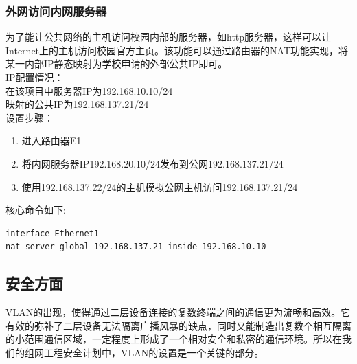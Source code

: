 \subsubsection{外网访问内网服务器}
为了能让公共网络的主机访问校园内部的服务器，如http服务器，这样可以让Internet上的主机访问校园官方主页。该功能可以通过路由器的NAT功能实现，将某一内部IP静态映射为学校申请的外部公共IP即可。
\\
\indent IP配置情况：
\\
\indent 在该项目中服务器IP为192.168.10.10/24
\\
\indent 映射的公共IP为192.168.137.21/24
\\
\indent 设置步骤：
\begin{enumerate}
\item 进入路由器E1
\item 将内网服务器IP192.168.20.10/24发布到公网192.168.137.21/24
\item 使用192.168.137.22/24的主机模拟公网主机访问192.168.137.21/24
\end{enumerate}

\indent 核心命令如下:
\begin{lstlisting}
interface Ethernet1
nat server global 192.168.137.21 inside 192.168.10.10
\end{lstlisting}
\subsection{安全方面}%
	VLAN的出现，使得通过二层设备连接的复数终端之间的通信更为流畅和高效。它有效的弥补了二层设备无法隔离广播风暴的缺点，同时又能制造出复数个相互隔离的小范围通信区域，一定程度上形成了一个相对安全和私密的通信环境。所以在我们的组网工程安全计划中，VLAN的设置是一个关键的部分。

